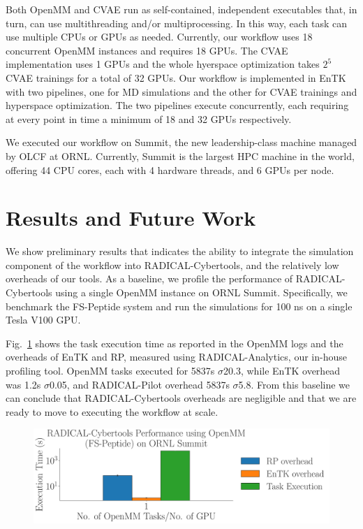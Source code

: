 \documentclass[conference,final]{IEEEtran}
\begin{document}
Both OpenMM and CVAE run as self-contained, independent executables that, in
turn, can use multithreading and/or multiprocessing. In this way, each task
can use multiple CPUs or GPUs as needed. Currently, our workflow uses 18
concurrent OpenMM instances and requires 18 GPUs. The CVAE implementation
uses 1 GPUs and the whole hyerspace optimization takes $2^5$ CVAE trainings
for a total of 32 GPUs. Our workflow is implemented in EnTK with two
pipelines, one for MD simulations and the other for CVAE trainings and
hyperspace optimization. The two pipelines execute concurrently, each
requiring at every point in time a minimum of 18 and 32 GPUs respectively.

We executed our workflow on Summit, the new leadership-class machine managed
by OLCF at ORNL\@. Currently, Summit is the largest HPC machine in the world,
offering 44 CPU cores, each with 4 hardware threads, and 6 GPUs per node.


\section{Results and Future Work}

We show preliminary results that indicates the ability to integrate the
simulation component of the workflow into RADICAL-Cybertools, and the
relatively low overheads of our tools.  As a baseline, we profile the
performance of RADICAL-Cybertools using a single OpenMM instance on ORNL
Summit. Specifically, we benchmark the FS-Peptide system and run the
simulations for 100 ns on a single Tesla V100 GPU. 

Fig.~\ref{fig:single_openmm} shows the task execution time as reported in the
OpenMM logs and the overheads of EnTK and RP, measured using
RADICAL-Analytics, our in-house profiling tool. OpenMM tasks executed for
5837s $\sigma$20.3, while EnTK overhead was 1.2s $\sigma$0.05, and
RADICAL-Pilot overhead 5837s $\sigma$5.8. From this baseline we can
conclude that RADICAL-Cybertools overheads are negligible and that we are
ready to move to executing the workflow at scale.

\begin{figure}
    \centering
    \includegraphics[width=.8\textwidth]{single_openmm}
    \caption{}
    \label{fig:single_openmm}
\end{figure}





\end{document}
